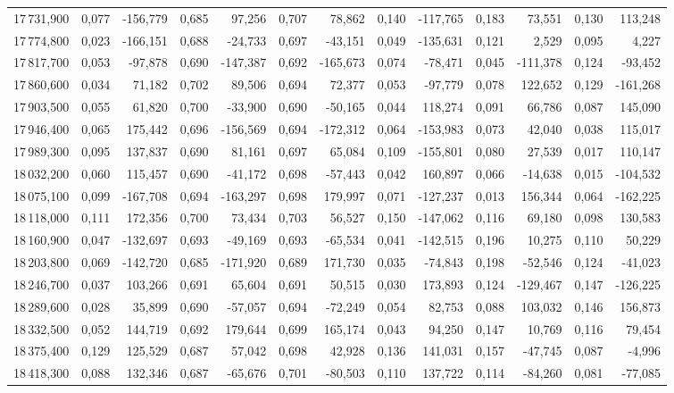 \begin{longtable}{rrrrrrrrrrrrr}
17\,731,900 & 0,077 & -156,779 & 0,685 & 97,256 & 0,707 & 78,862 & 0,140 & -117,765 & 0,183 & 73,551 & 0,130 & 113,248\\
17\,774,800 & 0,023 & -166,151 & 0,688 & -24,733 & 0,697 & -43,151 & 0,049 & -135,631 & 0,121 & 2,529 & 0,095 & 4,227\\
17\,817,700 & 0,053 & -97,878 & 0,690 & -147,387 & 0,692 & -165,673 & 0,074 & -78,471 & 0,045 & -111,378 & 0,124 & -93,452\\
17\,860,600 & 0,034 & 71,182 & 0,702 & 89,506 & 0,694 & 72,377 & 0,053 & -97,779 & 0,078 & 122,652 & 0,129 & -161,268\\
17\,903,500 & 0,055 & 61,820 & 0,700 & -33,900 & 0,690 & -50,165 & 0,044 & 118,274 & 0,091 & 66,786 & 0,087 & 145,090\\
17\,946,400 & 0,065 & 175,442 & 0,696 & -156,569 & 0,694 & -172,312 & 0,064 & -153,983 & 0,073 & 42,040 & 0,038 & 115,017\\
17\,989,300 & 0,095 & 137,837 & 0,690 & 81,161 & 0,697 & 65,084 & 0,109 & -155,801 & 0,080 & 27,539 & 0,017 & 110,147\\
18\,032,200 & 0,060 & 115,457 & 0,690 & -41,172 & 0,698 & -57,443 & 0,042 & 160,897 & 0,066 & -14,638 & 0,015 & -104,532\\
18\,075,100 & 0,099 & -167,708 & 0,694 & -163,297 & 0,698 & 179,997 & 0,071 & -127,237 & 0,013 & 156,344 & 0,064 & -162,225\\
18\,118,000 & 0,111 & 172,356 & 0,700 & 73,434 & 0,703 & 56,527 & 0,150 & -147,062 & 0,116 & 69,180 & 0,098 & 130,583\\
18\,160,900 & 0,047 & -132,697 & 0,693 & -49,169 & 0,693 & -65,534 & 0,041 & -142,515 & 0,196 & 10,275 & 0,110 & 50,229\\
18\,203,800 & 0,069 & -142,720 & 0,685 & -171,920 & 0,689 & 171,730 & 0,035 & -74,843 & 0,198 & -52,546 & 0,124 & -41,023\\
18\,246,700 & 0,037 & 103,266 & 0,691 & 65,604 & 0,691 & 50,515 & 0,030 & 173,893 & 0,124 & -129,467 & 0,147 & -126,225\\
18\,289,600 & 0,028 & 35,899 & 0,690 & -57,057 & 0,694 & -72,249 & 0,054 & 82,753 & 0,088 & 103,032 & 0,146 & 156,873\\
18\,332,500 & 0,052 & 144,719 & 0,692 & 179,644 & 0,699 & 165,174 & 0,043 & 94,250 & 0,147 & 10,769 & 0,116 & 79,454\\
18\,375,400 & 0,129 & 125,529 & 0,687 & 57,042 & 0,698 & 42,928 & 0,136 & 141,031 & 0,157 & -47,745 & 0,087 & -4,996\\
18\,418,300 & 0,088 & 132,346 & 0,687 & -65,676 & 0,701 & -80,503 & 0,110 & 137,722 & 0,114 & -84,260 & 0,081 & -77,085\\

\end{longtable}
